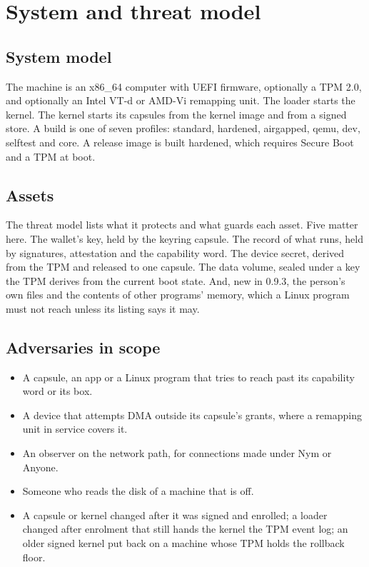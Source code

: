 \section{System and threat model}\label{sec:model}

\subsection{System model}

The machine is an x86\_64 computer with UEFI firmware, optionally a TPM 2.0, and optionally an Intel VT-d or AMD-Vi remapping unit. The loader  starts the kernel. The kernel starts its capsules from the kernel image and from a signed store. A build is one of seven profiles: standard, hardened, airgapped, qemu, dev, selftest and core. A release image is built hardened, which requires Secure Boot and a TPM at boot.

\subsection{Assets}

The threat model lists what it protects and what guards each asset. Five matter here. The wallet's key, held by the keyring capsule. The record of what runs, held by signatures, attestation and the capability word. The device secret, derived from the TPM and released to one capsule. The data volume, sealed under a key the TPM derives from the current boot state. And, new in 0.9.3, the person's own files and the contents of other programs' memory, which a Linux program must not reach unless its listing says it may.

\subsection{Adversaries in scope}

\begin{itemize}
\item A capsule, an app or a Linux program that tries to reach past its capability word or its box.
\item A device that attempts DMA outside its capsule's grants, where a remapping unit in service covers it.
\item An observer on the network path, for connections made under Nym or Anyone.
\item Someone who reads the disk of a machine that is off.
\item A capsule or kernel changed after it was signed and enrolled; a loader changed after enrolment that still hands the kernel the TPM event log; an older signed kernel put back on a machine whose TPM holds the rollback floor.
\end{itemize}

